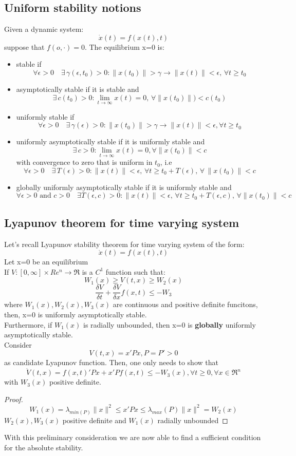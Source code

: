 \subsection{Uniform stability notions}
Given a dynamic system:
\[\dot{x}(t)=f(x(t),t)\] suppose that $f(o,\cdot)=0$. The equilibrium x=0 is:
\begin{itemize}
	\item stable if \[\forall\epsilon>0 \quad \exists \, \gamma(\epsilon,t_0)>0\colon\|x(t_0)\|>\gamma\to\|x(t)\|<\epsilon,\,\forall t\ge t_0\]
	\item asymptotically stable if it is stable and \[\exists \, c(t_0)>0\colon \lim_{t\rightarrow \infty}x(t)=0,\, \forall\|x(t_0)\|)<c(t_0)	\]
	\item uniformly stable if \[\forall\epsilon>0 \quad \exists \, \gamma(\epsilon)>0\colon\|x(t_0)\|>\gamma\to\|x(t)\|<\epsilon,\forall t\ge t_0\]
	\item uniformly asymptotically stable if it is uniformly stable and \[ \exists \, c >0\colon \lim_{t\rightarrow\infty}x(t)=0,\forall \|x(t_0)\|<c\] with convergence to zero that is uniform in $t_0$, i.e \[\forall\epsilon>0\quad \exists \, T(\epsilon)>0\colon\|x(t)\|<\epsilon,\,\forall t\ge t_0+T(\epsilon),\, \forall \,  \|x(t_0)\|<c\]
	\item globally uniformly asymptotically stable if it is uniformly stable and \[\forall \epsilon >0 \text{ and } c>0\quad  \exists T(\epsilon,c)> 0\colon\|x(t)\|<\epsilon,\, \forall t \ge t_0+T(\epsilon,c), \,\forall\|x(t_0)\|<c\]
\end{itemize}
\subsection{Lyapunov theorem for time varying system} \label{LYAptv}
Let's recall Lyapunov stability theorem for time varying system of the form:\[\dot{x}(t)=f(x(t),t)	\]
Let x=0 be an equilibrium\\If $V\colon [0,\infty]\times 	Re^n\to\Re$ is a $C^1$ function such that:\[W_1(x)\ge V(t,x) \ge W_2(x)\]\[\frac{\delta V}{\delta t}+\frac{\delta V}{\delta x}f(x,t)\le-W_3\] where $W_1(x), W_2(x), W_3(x)$ are continuous and positive definite funcitons, then, x=0 is uniformly asymptotically stable.\\Furthermore, if $W_1(x)$ is radially unbounded, then x=0 is \textbf{globally} uniformly asymptotically stable.\\Consider\[V(t,x)=x'Px,P=P'>0\] as candidate Lyapunov function. Then, one only needs to show that \[\dot{V}(t,x)=f(x,t)'Px+x'Pf(x,t)\le-W_3(x),\forall t\ge 0,\forall x \in \Re^n\] with $W_3(x)$ positive definite.
\begin{proof}
	\[W_1(x)=\lambda_{min(P)}\|x\|^2\le x'Px\le\lambda_{max}(P)\|x\|^2=W_2(x)\] $W_2(x), W_3(x)$ positive definite and $W_1(x)$ radially unbounded
\end{proof}
With this preliminary consideration we are now able to find a sufficient condition for the absolute stability.

